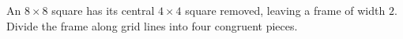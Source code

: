 An $8\times8$ square has its central $4\times4$ square removed, leaving a frame of width $2$. Divide the frame along grid lines into four congruent pieces.
